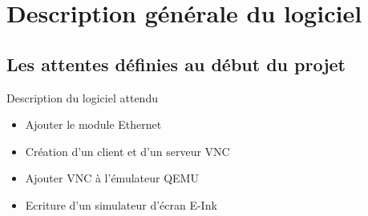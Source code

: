 \section[Description]{Description générale du logiciel}
\subsection[Objectifs]{Les attentes définies au début du projet}

\begin{frame}

	\begin{block}{Description du logiciel attendu}

		\begin{itemize}	
			\item Ajouter le module Ethernet
			\item Création d'un client et d'un serveur VNC
			\item Ajouter VNC à l'émulateur QEMU
			\item Ecriture d'un simulateur d'écran E-Ink
		\end{itemize}

	\end{block}

\end{frame}

